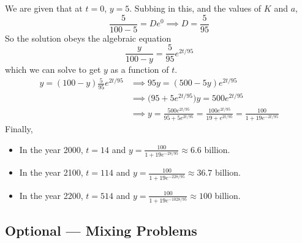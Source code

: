 \begin{eg}
We are given that at $t=0$, $y=5$. Subbing in this, and the values of $K$
and $a$,
\begin{equation*}
\frac{5}{100-5}=De^{0}
\implies D=\frac{5}{95}
\end{equation*}
So the solution obeys the algebraic equation
\begin{equation*}
 \frac{y}{100-y}=\frac{5}{95}e^{2t/95}
\end{equation*}
which we can solve to get $y$ as a function of $t$.
\begin{align*}
 y=(100-y)\frac{5}{95}e^{2t/95}
     &\implies 95y=(500-5y)e^{2t/95} \\
     &\implies \big(95+5e^{2t/95}\big)y=500 e^{2t/95} \\
     &\implies y=\frac{500e^{2t/95}}{95+5e^{2t/95}}
=\frac{100e^{2t/95}}{19+e^{2t/95}}
=\frac{100}{1+19e^{-2t/95}}
\end{align*}
Finally,
\begin{itemize}\itemsep1pt \parskip0pt  %
\item  In the year 2000, $t=14$ and
                 $y=\frac{100}{1+19e^{-28/95}}\approx6.6$ billion.
\item  In the year 2100, $t=114$ and
                $y=\frac{100}{1+19e^{-228/95}}\approx 36.7$ billion.
\item  In the year 2200, $t=514$ and
                $y=\frac{100}{1+19e^{-1028/95}}\approx 100$ billion.
\end{itemize}
\end{eg}



\subsection{Optional --- Mixing Problems}

